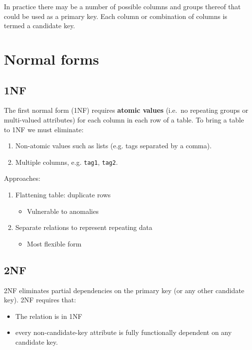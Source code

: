 In practice there may be a number of possible columns and groups thereof
that could be used as a primary key. Each column or combination of
columns is termed a candidate key.

\section{Normal forms}\label{normal-forms}

\subsection{1NF}\label{nf}

The first normal form (1NF) requires \textbf{atomic values} (i.e.~no repeating
groups or multi-valued attributes) for each column in each row of a table.
To bring a table to 1NF we must eliminate:
\begin{enumerate}
\item Non-atomic values such as lists (e.g. tags separated by a comma).
\item Multiple columns, e.g. \texttt{tag1}, \texttt{tag2}.
\end{enumerate}
Approaches:
\begin{enumerate}
\item
  Flattening table: duplicate rows
  \begin{itemize}
  \item
    Vulnerable to anomalies
  \end{itemize}
\item
  Separate relations to represent repeating data
  \begin{itemize}  
  \item
    Most flexible form
  \end{itemize}
\end{enumerate}

\subsection{2NF}\label{nf-1}

2NF eliminates partial dependencies on the primary key (or any other candidate key).  
2NF requires that:

\begin{itemize}
\item
  The relation is in 1NF
\item
  every non-candidate-key attribute is fully functionally dependent on
  any candidate key.
\end{itemize}

